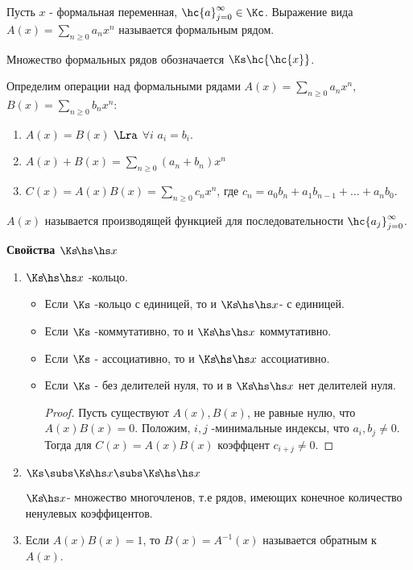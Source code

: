 \documentclass[unicode,10pt]{article}
\begin{document}
\begin{df}
  Пусть $x$ - формальная переменная, $\hc{a}_{j=0}^\infty\in\Kc$.
  Выражение вида $\displaystyle A(x)=\sum_{n\ge 0}a_nx^n$ называется формальным рядом.
\end{df}
\begin{denote}
  Множество формальных рядов обозначается $\Ks\hc{\hc{x}}$.
\end{denote}
Определим операции над формальными рядами $\displaystyle A(x)=\sum_{n\ge 0}a_nx^n$,
$\displaystyle B(x)=\sum_{n\ge 0}b_nx^n$:
\begin{enumerate}
  \item $A(x)=B(x)$ $\Lra$ $\forall i$ $a_i=b_i$.
  \item $\displaystyle A(x)+B(x) = \sum_{n\ge 0}(a_n+b_n)x^n$
  \item $C(x)=A(x)B(x)=\sum_{n\ge 0}c_nx^n$, где $c_n=a_0b_n+a_1b_{n-1}+\dots+a_nb_0$.
\end{enumerate}
\begin{denote}
  $A(x)$ называется производящей функцией для  последовательности  $\hc{a_j}_{j=0}^\infty$.
\end{denote}
{\bf Свойства $\Ksr$\par}
\begin{enumerate}
  \item $\Ksr$ -кольцо.
    \begin{itemize}
      \item Если $\Ks$ -кольцо с единицей, то и $\Ksr$- с единицей.
      \item Если $\Ks$ -коммутативно, то и $\Ksr$ коммутативно.
      \item Если $\Ks$ - ассоциативно, то и $\Ksr$ ассоциативно.
      \item Если $\Ks$ - без делителей нуля, то и в $\Ksr$ нет делителей нуля.
        \begin{proof}
          Пусть существуют $A(x),B(x)$, не равные нулю, что $A(x)B(x)=0$. Положим,
          $i,j$ -минимальные индексы, что $a_i,b_j\neq 0$. Тогда для $C(x)=A(x)B(x)$ коэффцент
          $c_{i+j}\neq 0$.
        \end{proof}
    \end{itemize}
    \item      $\displaystyle \Ks\subs\Ksm\subs\Ksr$
      \begin{df}
        $\Ksm$- множество многочленов, т.е рядов, имеющих конечное количество ненулевых
        коэффицентов.
      \end{df}
      \item Если $A(x)B(x)=1$, то $B(x)=A^{-1}(x)$ называется обратным к $A(x)$.
\end{enumerate}
\end{document}
